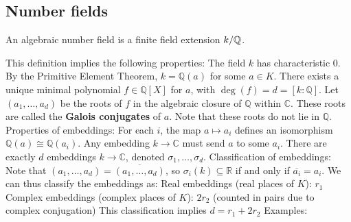 \subsection{Number fields}
\begin{outline}
    \begin{definition}
        An algebraic number field is a finite field extension $k/\mathbb{Q}$. 
    \end{definition}
        \1 This definition implies the following properties:
            \2 The field $k$ has characteristic 0.
            \2 By the Primitive Element Theorem, $k = \mathbb{Q}(a)$ for some $a \in K$.
            \2 There exists a unique minimal polynomial $f \in \mathbb{Q}[X]$ for $a$, with $\deg(f) = d = [k:\mathbb{Q}]$.
        \1 Let $(a_1, \ldots, a_d)$ be the roots of $f$ in the algebraic closure of $\mathbb{Q}$ within $\mathbb{C}$. These roots are called the \textbf{Galois conjugates} of $a$. Note that these roots do not lie in $\mathbb{Q}$.
        \1 Properties of embeddings:
            \2 For each $i$, the map $a \mapsto a_i$ defines an isomorphism $\mathbb{Q}(a) \cong \mathbb{Q}(a_i)$.
            \2 Any embedding $k\rightarrow \mathbb{C}$ must send $a$ to some $a_i$.
            \2 There are exactly $d$ embeddings $k \rightarrow \mathbb{C}$, denoted $\sigma_1, \ldots, \sigma_d$.
        \1 Classification of embeddings:        
            \2 Note that $(a_1, \ldots, a_d) = \overline{(a_1, \ldots, a_d)}$, so $\sigma_i(k) \subseteq \mathbb{R}$ if and only if $\overline{a_i} = a_i$.
            \2 We can thus classify the embeddings as:
                \3 Real embeddings (real places of $K$): $r_1$
                \3 Complex embeddings (complex places of $K$): $2r_2$ (counted in pairs due to complex conjugation)
            \2 This classification implies $d = r_1 + 2r_2$
        \1 Examples:

\end{outline}
